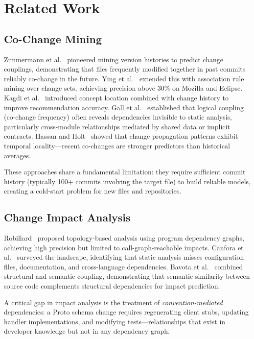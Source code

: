 \documentclass[sigconf,nonacm]{acmart}
\begin{document}
\section{Related Work}
\label{sec:related}

\subsection{Co-Change Mining}

Zimmermann et al.~\cite{zimmermann2005} pioneered mining version histories to predict change couplings, demonstrating that files frequently modified together in past commits reliably co-change in the future. Ying et al.~\cite{ying2004} extended this with association rule mining over change sets, achieving precision above 30\% on Mozilla and Eclipse. Kagdi et al.~\cite{kagdi2007} introduced concept location combined with change history to improve recommendation accuracy. Gall et al.~\cite{gall1998} established that logical coupling (co-change frequency) often reveals dependencies invisible to static analysis, particularly cross-module relationships mediated by shared data or implicit contracts. Hassan and Holt~\cite{hassan2004} showed that change propagation patterns exhibit temporal locality---recent co-changes are stronger predictors than historical averages.

These approaches share a fundamental limitation: they require sufficient commit history (typically 100+ commits involving the target file) to build reliable models, creating a cold-start problem for new files and repositories.

\subsection{Change Impact Analysis}

Robillard~\cite{robillard2005} proposed topology-based analysis using program dependency graphs, achieving high precision but limited to call-graph-reachable impacts. Canfora et al.~\cite{canfora2014} surveyed the landscape, identifying that static analysis misses configuration files, documentation, and cross-language dependencies. Bavota et al.~\cite{bavota2014} combined structural and semantic coupling, demonstrating that semantic similarity between source code complements structural dependencies for impact prediction.

A critical gap in impact analysis is the treatment of \emph{convention-mediated} dependencies: a Proto schema change requires regenerating client stubs, updating handler implementations, and modifying tests---relationships that exist in developer knowledge but not in any dependency graph.
\end{document}
